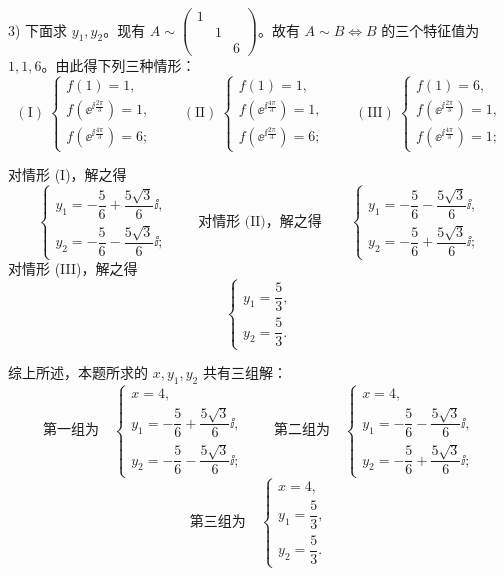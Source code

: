 \begin{solution}
3) 下面求 $y_1,y_2$。现有 $A\sim\begin{pmatrix}1&&\\&1&\\&&6\end{pmatrix}$。故有 $A\sim B\iff B$ 的三个特征值为 $1,1,6$。由此得下列三种情形：
\[
(\mathrm{I})\ \begin{cases}f(1)=1,\\ f(\ee^{\ii\frac{2\pi}{3}})=1,\\ f(\ee^{\ii\frac{4\pi}{3}})=6;\end{cases}
\qquad
(\mathrm{II})\ \begin{cases}f(1)=1,\\ f(\ee^{\ii\frac{4\pi}{3}})=1,\\ f(\ee^{\ii\frac{2\pi}{3}})=6;\end{cases}
\qquad
(\mathrm{III})\ \begin{cases}f(1)=6,\\ f(\ee^{\ii\frac{2\pi}{3}})=1,\\ f(\ee^{\ii\frac{4\pi}{3}})=1;\end{cases}
\]

对情形 (I)，解之得
\[
\begin{cases}y_1=-\dfrac{5}{6}+\dfrac{5\sqrt{3}}{6}\ii,\\[4pt] y_2=-\dfrac{5}{6}-\dfrac{5\sqrt{3}}{6}\ii;\end{cases}
\qquad
\text{对情形 (II)，解之得}
\qquad
\begin{cases}y_1=-\dfrac{5}{6}-\dfrac{5\sqrt{3}}{6}\ii,\\[4pt] y_2=-\dfrac{5}{6}+\dfrac{5\sqrt{3}}{6}\ii;\end{cases}
\]
对情形 (III)，解之得
\[
\begin{cases}y_1=\dfrac{5}{3},\\[4pt] y_2=\dfrac{5}{3}.\end{cases}
\]

综上所述，本题所求的 $x,y_1,y_2$ 共有三组解：
\[
\text{第一组为}\quad\begin{cases}x=4,\\ y_1=-\dfrac{5}{6}+\dfrac{5\sqrt{3}}{6}\ii,\\[4pt] y_2=-\dfrac{5}{6}-\dfrac{5\sqrt{3}}{6}\ii;\end{cases}
\qquad
\text{第二组为}\quad\begin{cases}x=4,\\ y_1=-\dfrac{5}{6}-\dfrac{5\sqrt{3}}{6}\ii,\\[4pt] y_2=-\dfrac{5}{6}+\dfrac{5\sqrt{3}}{6}\ii;\end{cases}
\]
\[
\text{第三组为}\quad\begin{cases}x=4,\\ y_1=\dfrac{5}{3},\\[4pt] y_2=\dfrac{5}{3}.\end{cases}
\]
\end{solution}

